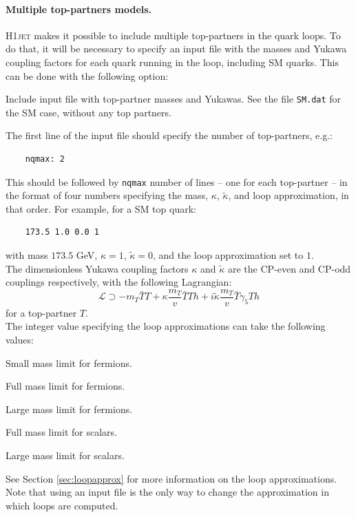 \documentclass[12pt]{article}
\begin{document}
\paragraph{Multiple top-partners models.}
\textsc{H1jet} makes it possible to include multiple top-partners in
the quark loops. To do that, it will be necessary to specify an input
file with the masses and Yukawa coupling factors for each quark
running in the loop, including SM quarks. This can be done with the
following option:
\begin{description}[labelindent=\parindent, labelwidth =\widthof{\bfseries9999999999999999999999}, leftmargin = !] 
\item[\texttt{-i, --in <file>}] Include input file with top-partner
  masses and Yukawas. See the file \texttt{SM.dat} for the SM case,
  without any top partners.
\end{description} 
The first line of the input file should specify the number of top-partners, e.g.: 
\begin{lstlisting}
	nqmax: 2 
\end{lstlisting}
This should be followed by \texttt{nqmax} number of lines -- one for each top-partner -- in the format of four numbers specifying the mass, $\kappa$, $\tilde{\kappa}$, and loop approximation, in that order. For example, for a SM top quark: 
\begin{lstlisting}
	173.5 1.0 0.0 1 
\end{lstlisting}
with mass $173.5$ GeV, $\kappa = 1$, $\tilde{\kappa} = 0$, and the loop approximation set to $1$. \\ 

The dimensionless Yukawa coupling factors $\kappa$ and $\tilde{\kappa}$ are the CP-even and CP-odd couplings respectively, with the following Lagrangian: 
\begin{equation}
	\mathcal{L} \supset -m_T \bar{T}T + \kappa \frac{m_T}{v} \bar{T}T h + i \tilde{\kappa} \frac{m_T}{v} \bar{T} \gamma_5 T h 
\end{equation}
for a top-partner $T$. \\ 

The integer value specifying the loop approximations can take the following values: 
\begin{description}[labelindent=3\parindent, labelwidth =\widthof{\bfseries9999}, leftmargin = !] 
	\item[$0$] Small mass limit for fermions. 
	\item[$1$] Full mass limit for fermions. 
	\item[$2$] Large mass limit for fermions. 
	\item[$3$] Full mass limit for scalars. 
	\item[$4$] Large mass limit for scalars. 
\end{description}
See Section \ref{sec:loopapprox} for more information on the loop
approximations. Note that using an input file is the only way to
change the approximation in which loops are computed. 
\end{document}

